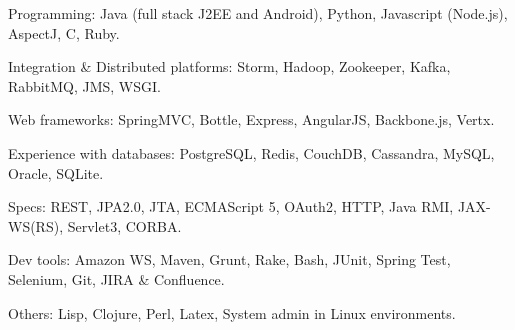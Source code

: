 \begin{rlist}
  \item Programming: Java (full stack J2EE and Android), Python, Javascript (Node.js),
  AspectJ, C, Ruby.
  \item Integration \& Distributed platforms: Storm, Hadoop, Zookeeper, Kafka, RabbitMQ, JMS, WSGI.
  \item Web frameworks: SpringMVC, Bottle, Express, AngularJS, Backbone.js, Vertx.
  \item Experience with databases: PostgreSQL, Redis, CouchDB, Cassandra, MySQL, Oracle, SQLite.
  \item Specs: REST, JPA2.0, JTA, ECMAScript 5, OAuth2, HTTP,
  Java RMI, JAX-WS(RS), Servlet3, CORBA.
  \item Dev tools: Amazon WS, Maven, Grunt, Rake, Bash, JUnit, Spring Test,
  Selenium, Git, JIRA \& Confluence.
  \item Others: Lisp, Clojure, Perl, Latex, System admin in Linux
  environments.
\end{rlist}

